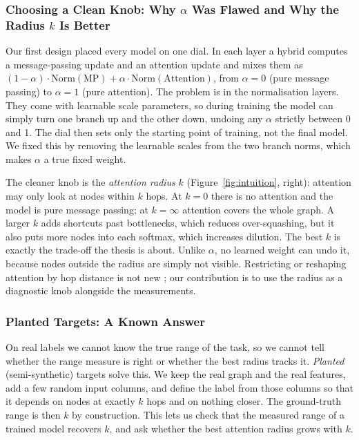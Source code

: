 \subsubsection{Choosing a Clean Knob: Why $\alpha$ Was Flawed and Why the Radius $k$ Is Better}
Our first design placed every model on one dial. In each layer a hybrid computes a message-passing update and an attention update and mixes them as $(1-\alpha)\cdot\mathrm{Norm}(\text{MP}) + \alpha\cdot\mathrm{Norm}(\text{Attention})$, from $\alpha=0$ (pure message passing) to $\alpha=1$ (pure attention). The problem is in the normalisation layers. They come with learnable scale parameters, so during training the model can simply turn one branch up and the other down, undoing any $\alpha$ strictly between 0 and 1. The dial then sets only the starting point of training, not the final model. We fixed this by removing the learnable scales from the two branch norms, which makes $\alpha$ a true fixed weight.

The cleaner knob is the \emph{attention radius} $k$ (Figure~\ref{fig:intuition}, right): attention may only look at nodes within $k$ hops. At $k=0$ there is no attention and the model is pure message passing; at $k=\infty$ attention covers the whole graph. A larger $k$ adds shortcuts past bottlenecks, which reduces over-squashing, but it also puts more nodes into each softmax, which increases dilution. The best $k$ is exactly the trade-off the thesis is about. Unlike $\alpha$, no learned weight can undo it, because nodes outside the radius are simply not visible. Restricting or reshaping attention by hop distance is not new \citep{f_gutteridge2023,f_abboud2022,ying2021}; our contribution is to use the radius as a diagnostic knob alongside the measurements.

\subsubsection{Planted Targets: A Known Answer}
On real labels we cannot know the true range of the task, so we cannot tell whether the range measure is right or whether the best radius tracks it. \emph{Planted} (semi-synthetic) targets solve this. We keep the real graph and the real features, add a few random input columns, and define the label from those columns so that it depends on nodes at exactly $k$ hops and on nothing closer. The ground-truth range is then $k$ by construction. This lets us check that the measured range of a trained model recovers $k$, and ask whether the best attention radius grows with $k$.


